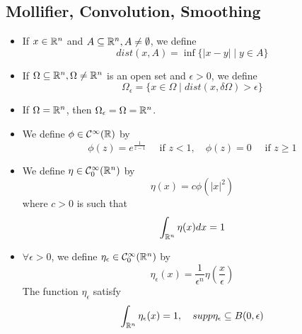 \subsection{Mollifier, Convolution, Smoothing}
\begin{DefBox}
    \begin{Def}
        \begin{itemize}
            \item If $x \in \mathbb{R}^n$ and $A \subseteq \mathbb{R}^n, A \neq \emptyset$, we define
            \begin{equation*}
                dist(x,A) = \inf\{|x-y| \mid y \in A\}
            \end{equation*}
            \item If $\Omega \subseteq \mathbb{R}^n, \Omega \neq \mathbb{R}^n$ is an open set and $\epsilon > 0$, we define 
            \begin{equation*}
                \Omega_\epsilon = \{x \in \Omega \mid dist(x,\delta \Omega) > \epsilon\}
            \end{equation*}
            \item If $\Omega = \mathbb{R}^n$, then $\Omega_\epsilon = \Omega = \mathbb{R}^n$. 
            \item We define $\phi \in \mathcal{C}^\infty(\mathbb{R})$ by 
            \begin{equation*}
                \phi(z) = e^{\frac{1}{z-1}} \quad \text{ if } z < 1, \quad \phi(z) = 0 \quad \text{ if } z \geq 1
            \end{equation*}
            \item We define $\eta \in \mathcal{C}^\infty_0(\mathbb{R}^n)$ by
            \begin{equation*}
                \eta(x) = c \phi(|x|^2)
            \end{equation*}
            where $c > 0$ is such that 
            \begin{equation*}
                \int_{\mathbb{R}^n} \eta(x) dx = 1
            \end{equation*}
            \item $\forall \epsilon > 0$, we define $\eta_\epsilon \in \mathcal{C}^\infty_0(\mathbb{R}^n)$ by 
            \begin{equation*}
                \eta_\epsilon(x) = \frac{1}{\epsilon^n} \eta(\frac{x}{\epsilon})
            \end{equation*}
            The function $\eta_\epsilon$ satisfy
            \begin{equation*}
                \int_{\mR^n} \eta_\epsilon(x) = 1, \quad supp \eta_\epsilon \subseteq B(0,\epsilon)

\end{equation*}
\end{itemize}
\end{Def}
\end{DefBox}
